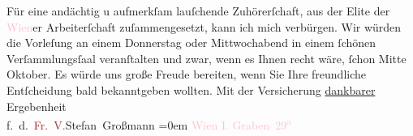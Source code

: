            \pstart
           Für eine andächtig u aufmerkſam lauſchende Zuhörerſchaft, aus der Elite der \textcolor{pink}{Wien}{}\ledrightnote{\textcolor{pink}{Wien}}er Arbeiterſchaft zuſammengesetzt, kann ich mich
               verbürgen.\pend
           \pstart
           Wir würden die Vorleſung an einem Donnerstag oder Mittwochabend in einem ſchönen
               Verſammlungsſaal veranſtalten und zwar, wenn es Ihnen recht wäre, ſchon Mitte
               Oktober.\pend
           \pstart
            Es würde uns große Freude bereiten, wenn Sie
               Ihre freundliche Entſcheidung bald bekanntgeben wollten.\pend
           \pstart
           Mit der Versicherung \uline{dankbarer} Ergebenheit{\\[\baselineskip]}
                  f. d. \textcolor{brown}{Fr. V.}{}\ledrightnote{\textcolor{brown}{Wiener Freie Volksbühne}}\spacefill\mbox{Stefan
                  Großmann}\pend
           \leftskip=0em{}\pstart
           \noindent{}\textcolor{pink}{Wien I. Graben 29\textsuperscript{a}}{}\ledrightnote{\textcolor{pink}{Graben}}\pend
           \endnumbering{}  
      